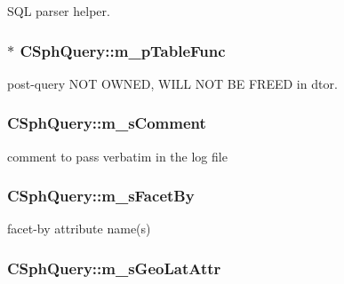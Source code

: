 S\-Q\-L parser helper. 

\hypertarget{classCSphQuery_ac1cbf2083d8fb68cf7643182660639af}{
\subsubsection[{m\-\_\-p\-Table\-Func}]{$\ast$ C\-Sph\-Query\-::m\-\_\-p\-Table\-Func}}\label{classCSphQuery_ac1cbf2083d8fb68cf7643182660639af}


post-\/query N\-O\-T O\-W\-N\-E\-D, W\-I\-L\-L N\-O\-T B\-E F\-R\-E\-E\-D in dtor. 

\hypertarget{classCSphQuery_a579757d29ee1b6cf6483326f8a8f4178}{
\subsubsection[{m\-\_\-s\-Comment}]{ C\-Sph\-Query\-::m\-\_\-s\-Comment}}\label{classCSphQuery_a579757d29ee1b6cf6483326f8a8f4178}


comment to pass verbatim in the log file 

\hypertarget{classCSphQuery_aaf5e150cf9573eaf96bfd77698def569}{
\subsubsection[{m\-\_\-s\-Facet\-By}]{ C\-Sph\-Query\-::m\-\_\-s\-Facet\-By}}\label{classCSphQuery_aaf5e150cf9573eaf96bfd77698def569}


facet-\/by attribute name(s) 

\hypertarget{classCSphQuery_a574047391f7256e1fa0355f358d86391}{
\subsubsection[{m\-\_\-s\-Geo\-Lat\-Attr}]{ C\-Sph\-Query\-::m\-\_\-s\-Geo\-Lat\-Attr}}\label{classCSphQuery_a574047391f7256e1fa0355f358d86391}


